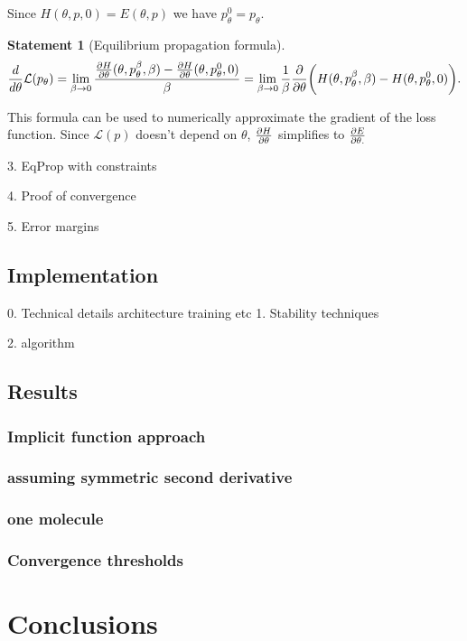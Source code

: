 \documentclass[a4paper,10pt]{report}
\newtheorem{statement}{Statement}
\begin{document}
Since $H(\theta,p,0) = E(\theta,p)$ we have $p_{\theta}^{0}=p_{\theta}$.

\begin{statement}[Equilibrium propagation formula]
 \begin{equation}
 \frac{d}{d\theta} \mathcal{L}(p_\theta) = \lim_{\beta \to 0} \frac{\frac{\partial H}{\partial \theta}(\theta, p_\theta^\beta, \beta)-\frac{\partial H}{\partial \theta}(\theta, p_\theta^0, 0) }{\beta} = \lim_{\beta \to 0}\frac{1}{\beta} \frac{\partial }{\partial \theta} \bigg(H(\theta, p_\theta^\beta,\beta) - H(\theta, p_\theta^0, 0)\bigg).
\end{equation}
\end{statement}
This formula can be used to numerically approximate the gradient of the loss function.
Since $\mathcal{L}(p)$ doesn't depend on $\theta$, $\frac{\partial H}{\partial \theta}$ simplifies to $\frac{\partial E}{\partial \theta.}$

3. EqProp with constraints



4. Proof of convergence

5. Error margins
\subsection{ Implementation}
0. Technical details
    architecture
    training
    etc
1. Stability techniques

2. algorithm
\subsection{Results}
\subsubsection{Implicit function approach}
\subsubsection{assuming symmetric second derivative}
\subsubsection{one molecule}
\subsubsection{Convergence thresholds}
\section{Conclusions}
\end{document}
